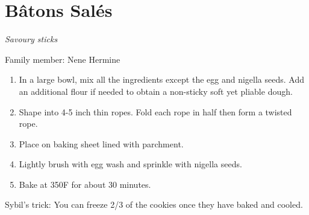 \chapter{Bâtons Salés}
\label{ch:batonsale}


\textit{Savoury sticks}

Family member: Nene Hermine

\begin{enumerate}
    \item In a large bowl, mix all the ingredients except the egg and nigella seeds. Add an additional flour if needed to obtain a non-sticky soft yet pliable dough.
    \item Shape into 4-5 inch thin ropes. Fold each rope in half then form a twisted rope.
    \item Place on baking sheet lined with parchment.
    \item Lightly brush with egg wash and sprinkle with nigella seeds.
    \item Bake at 350\degree F for about 30 minutes.
\end{enumerate}

Sybil's trick: You can freeze 2/3 of the cookies once they have baked and cooled.
